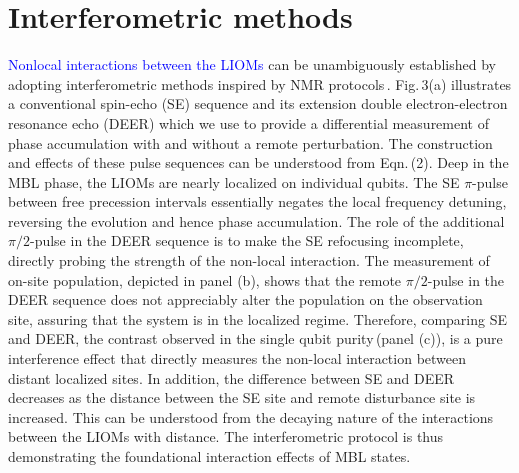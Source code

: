 \section{Interferometric methods} %
\textcolor{blue}{Nonlocal interactions between the LIOMs} can be unambiguously established by adopting interferometric methods inspired by NMR protocols\,\cite{KnapPRL2014}.  Fig.\,3(a) illustrates a conventional spin-echo (SE) sequence and its extension double electron-electron resonance echo (DEER) which we use to provide a differential measurement of phase accumulation with and without a remote perturbation. The construction and effects of these pulse sequences can be understood from Eqn.\,(2). Deep in the MBL phase, the LIOMs are nearly localized on individual qubits. The SE $\pi$-pulse between free precession intervals essentially negates the local frequency detuning, reversing the evolution and hence phase accumulation. The role of the additional $\pi/2$-pulse in the DEER sequence is to make the SE refocusing incomplete, directly probing the strength of the non-local interaction. The measurement of on-site population, depicted in panel (b), shows that the remote $\pi / 2$-pulse in the DEER sequence does not appreciably alter the population on the observation site, assuring that the system is in the localized regime. Therefore, comparing SE and DEER, the contrast observed in the single qubit purity\,(panel (c)), is a pure interference effect that directly measures the non-local interaction between distant localized sites. In addition, the difference between SE and DEER decreases as the distance between the SE site and remote disturbance site is increased. This can be understood from the decaying nature of the interactions between the LIOMs with distance. The interferometric protocol is thus demonstrating the foundational interaction effects of MBL states.


